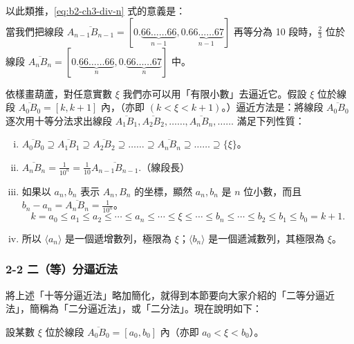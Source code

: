 以此類推，\eqref{eq:b2-ch3-div-n} 式的意義是：\\
當我們把線段 $\overline{A_{n-1} B_{n-1}} = [0.\underbrace{66\dots\dots 66}_{n-1}, 0.\underbrace{66\dots\dots 67}_{n-1}]$ 再等分為 10 段時，$\frac{2}{3}$ 位於線段 $\overline{A_n B_n} = [0.\underbrace{66\dots\dots 66}_{n}, 0.\underbrace{66\dots\dots 67}_{n}]$ 中。

依樣畫葫蘆，對任意實數 $\xi$ 我們亦可以用「有限小數」去逼近它。假設 $\xi$ 位於線段 $\overline{A_0 B_0}=[k, k+1]$ 內，（亦即 $(k < \xi < k+1)$。）逼近方法是：將線段 $\overline{A_0 B_0}$ 逐次用十等分法求出線段 $\overline{A_1 B_1}, \overline{A_2 B_2}, \dots\dots, \overline{A_n B_n}, \dots\dots$ 滿足下列性質：
\begin{enumerate}[(i)]
    \item $\overline{A_0 B_0} \supseteq \overline{A_1 B_1} \supseteq \overline{A_2 B_2} \supseteq \dots\dots \supseteq \overline{A_n B_n} \supseteq \dots\dots \supseteq \{\xi\}$。
    \item $\overline{A_n B_n} = \frac{1}{10^n} = \frac{1}{10}\overline{A_{n-1} B_{n-1}}$.（線段長）
    \item 如果以 $a_n, b_n$ 表示 $A_n, B_n$ 的坐標，顯然 $a_n, b_n$ 是 $n$ 位小數，而且 $b_n - a_n = \overline{A_n B_n} = \frac{1}{10^n}$。
    \[
    k = a_0 \le a_1 \le a_2 \le \cdots \le a_n \le \cdots \le \xi \le \cdots \le b_n \le \cdots \le b_2 \le b_1 \le b_0 = k+1.
    \]
    \item 所以 $\langle a_n \rangle$ 是一個遞增數列，極限為 $\xi$；$\langle b_n \rangle$ 是一個遞減數列，其極限為 $\xi$。
\end{enumerate}

\subsubsection*{2-2 二（等）分逼近法}

將上述「十等分逼近法」略加簡化，就得到本節要向大家介紹的「二等分逼近法」，簡稱為「二分逼近法」，或「二分法」。現在說明如下：

設某數 $\xi$ 位於線段 $\overline{A_0 B_0}=[a_0, b_0]$ 內（亦即 $a_0 < \xi < b_0$）。

